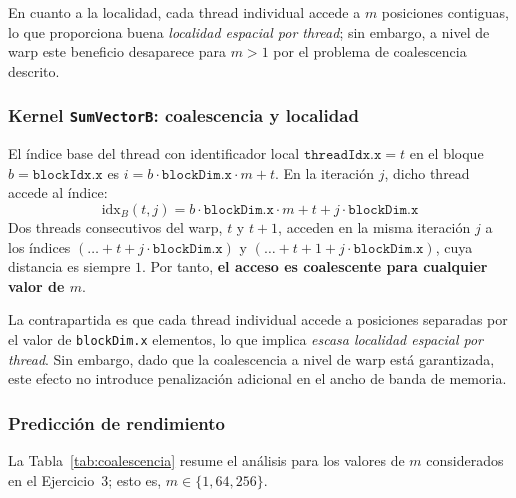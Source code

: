 \documentclass[12pt]{article}
\newenvironment{exercise}[2][Ejercicio]{\begin{trivlist}
\item[\hskip \labelsep {\bfseries #1}\hskip \labelsep {\bfseries #2.}]}{\end{trivlist}}
\begin{document}
\begin{exercise}{2}
    En cuanto a la localidad, cada thread individual accede a $m$ posiciones contiguas, lo que
    proporciona buena \textit{localidad espacial por thread}; sin embargo, a nivel de warp este
    beneficio desaparece para $m > 1$ por el problema de coalescencia descrito.

    \subsubsection*{Kernel \texttt{SumVectorB}: coalescencia y localidad}

    El índice base del thread con identificador local $\texttt{threadIdx.x} = t$ en el bloque
    $b = \texttt{blockIdx.x}$ es $i = b \cdot \texttt{blockDim.x} \cdot m + t$. En la iteración
    $j$, dicho thread accede al índice:
    \begin{equation}
        \text{idx}_B(t,j) = b \cdot \texttt{blockDim.x} \cdot m + t + j \cdot \texttt{blockDim.x}
    \end{equation}
    Dos threads consecutivos del warp, $t$ y $t+1$, acceden en la misma iteración $j$ a los índices
    $(\ldots + t + j \cdot \texttt{blockDim.x})$ y $(\ldots + t+1 + j \cdot \texttt{blockDim.x})$,
    cuya distancia es siempre $1$. Por tanto, \textbf{el acceso es coalescente para cualquier valor
        de $m$}.

    La contrapartida es que cada thread individual accede a posiciones separadas por el valor de
    \texttt{blockDim.x} elementos, lo que implica \textit{escasa localidad espacial por thread}.
    Sin embargo, dado que la coalescencia a nivel de warp está garantizada, este efecto no introduce
    penalización adicional en el ancho de banda de memoria.

    \subsubsection*{Predicción de rendimiento}

    La Tabla~\ref{tab:coalescencia} resume el análisis para los valores de $m$ considerados en el
    Ejercicio~3; esto es, $m \in \{1, 64, 256\}$.


\end{exercise}
\end{document}
